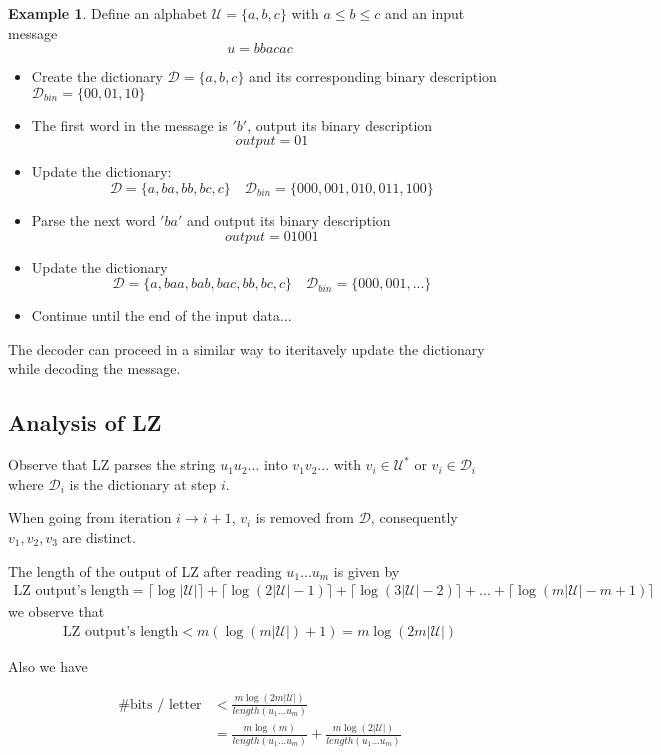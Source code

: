 \documentclass[twoside]{article}
\theoremstyle{definition} %
\newtheorem{example}{Example}
\def\D{\mathcal{D}}
\def\U{\mathcal{U}}
\begin{document}
\begin{example}
  Define an alphabet $\U = \{a, b, c\}$ with $a \leq b \leq c$ and an input message
  $$ u = b b a c a c $$
  \begin{itemize}
    \item Create the dictionary $\D = \{a, b, c\}$ and its corresponding binary description $\D_{bin} = \{00, 01, 10\}$
    \item The first word in the message is $'b'$, output its binary description
    $$ output = 01 $$
    \item Update the dictionary:
    $$ \D = \{a, ba, bb, bc , c\} \quad \D_{bin} = \{000, 001, 010, 011, 100\} $$
    \item Parse the next word $'ba'$ and output its binary description
    $$ output = 01 001 $$
    \item Update the dictionary
    $$ \D = \{a, baa, bab, bac, bb, bc , c\} \quad \D_{bin} = \{000, 001, ...\} $$
    \item Continue until the end of the input data...
  \end{itemize}
  The decoder can proceed in a similar way to iteritavely update the dictionary while decoding the message.
\end{example}

\subsection{Analysis of LZ}

Observe that LZ parses the string $u_1 u_2 ...$ into $v_1 v_2 ...$ with $v_i \in \U^*$ or $v_i \in \D_i$ where $\D_i$ is the dictionary at step $i$.

When going from iteration $i \rightarrow i+1$, $v_i$ is removed from $\D$, consequently $v_1, v_2, v_3$ are distinct.

The length of the output of LZ after reading $u_1 ... u_m$ is given by
\begin{align*}
  \text{LZ output's length} = \lceil \log |\U| \rceil + \lceil \log (2 |\U| - 1) \rceil
  + \lceil \log (3 |\U| - 2) \rceil + ...
  + \lceil \log (m|\U| - m + 1) \rceil
\end{align*}
we observe that
\begin{align*}
  \text{LZ output's length} < m(\log(m |\U|) + 1) = m \log(2 m |\U|)
\end{align*}

Also we have

\begin{align*}
  \text{\# bits / letter} &< \frac{m \log(2m |\U|)}{length(u_1 ... u_m)} \\
  &= \frac{m \log(m)}{ length(u_1 ... u_m)} + \frac{m \log(2 |\U|)}{length(u_1 ... u_m)}
\end{align*}
\end{document}

